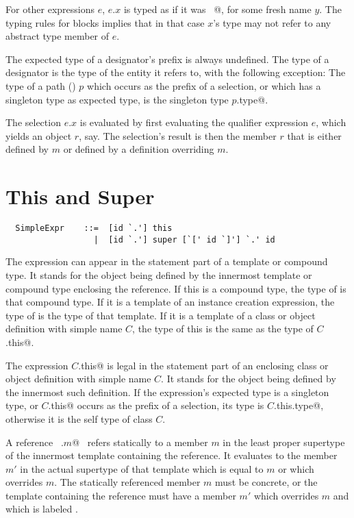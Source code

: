For other expressions $e$, $e.x$ is typed as
if it was ~@, for some fresh name
$y$.  The typing rules for blocks implies that in that case $x$'s type
may not refer to any abstract type member of $e$.

The expected type of a designator's prefix is always undefined.  The
type of a designator is the type of the entity it refers to, with the
following exception: The type of a path () $p$ which
occurs as the prefix of a selection, or which has a singleton type as
expected type, is the singleton type \lstinline@$p$.type@.

The selection $e.x$ is evaluated by first evaluating the qualifier
expression $e$, which yields an object $r$, say. The selection's
result is then the member $r$ that is either defined by $m$ or defined
by a definition overriding $m$.

\section{This and Super}
\label{sec:this-super}

\syntax\begin{lstlisting}
  SimpleExpr    ::=  [id `.'] this
                  |  [id `.'] super [`[' id `]'] `.' id
\end{lstlisting}

The expression  can appear in the statement part of a
template or compound type. It stands for the object being defined by
the innermost template or compound type enclosing the reference. If
this is a compound type, the type of  is that compound type.
If it is a template of an instance creation expression, the type of
 is the type of that template. If it is a template of a
class or object definition with simple name $C$, the type of this
is the same as the type of \lstinline@$C$.this@.

The expression \lstinline@$C$.this@ is legal in the statement part of an
enclosing class or object definition with simple name $C$. It
stands for the object being defined by the innermost such definition.
If the expression's expected type is a singleton type, or
\lstinline@$C$.this@ occurs as the prefix of a selection, its type is
\lstinline@$C$.this.type@, otherwise it is the self type of class $C$.

A reference ~\lstinline@super.$m$@~ refers statically to a member $m$
in the least proper supertype of the innermost template containing the
reference.  It evaluates to the member $m'$ in the actual supertype of
that template which is equal to $m$ or which overrides $m$.  The
statically referenced member $m$ must be concrete, or the template
containing the reference must have a member $m'$ which overrides $m$
and which is labeled .  

